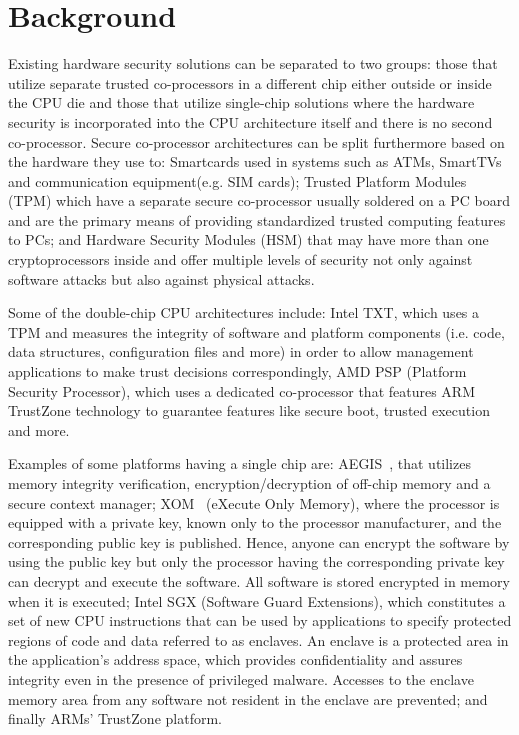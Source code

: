 \documentclass[cameraready]{cseminar}
\begin{document}

\section{Background}
\label{background}

Existing hardware security solutions can be separated to two groups: those that utilize separate trusted co-processors in a different chip either outside or inside the CPU die and those that utilize single-chip solutions where the hardware security is incorporated into the CPU architecture itself and there is no second co-processor. Secure co-processor architectures can be split furthermore based on the hardware they use to: Smartcards used in systems such as ATMs, SmartTVs and communication equipment(e.g. SIM cards); Trusted Platform Modules (TPM) which have a separate secure co-processor usually soldered on a PC board and are the primary means of providing standardized trusted computing features to PCs; and Hardware Security Modules (HSM) that may have more than one cryptoprocessors inside and offer multiple levels of security not only against software attacks but also against physical attacks.

Some of the double-chip CPU architectures include: Intel TXT, which uses a TPM and measures the integrity of software and platform components (i.e. code, data structures, configuration files and more) in order to allow management applications to make trust decisions correspondingly, AMD PSP (Platform Security Processor), which uses a dedicated co-processor that features ARM TrustZone technology to guarantee features like secure boot, trusted execution and more.

Examples of some platforms having a single chip are: AEGIS~\cite{aegis}, that utilizes memory integrity verification, encryption/decryption of off-chip memory and a secure context manager; XOM~\cite{xom} (eXecute Only Memory), where the processor is equipped with a private key, known only to the processor manufacturer, and the corresponding public key is published. Hence, anyone can encrypt the software by using the public key but only the processor having the corresponding private key can decrypt and execute the software. All software is stored encrypted in memory when it is executed; Intel SGX (Software Guard Extensions)\cite{intelsgx}, which constitutes a set of new CPU instructions that can be used by applications to specify protected regions of code and data referred to as enclaves. An enclave is a protected area in the application's address space, which provides confidentiality and assures integrity even in the presence of privileged malware. Accesses to the enclave memory area from any software not resident in the enclave are prevented; and finally ARMs' TrustZone platform.
\end{document}
